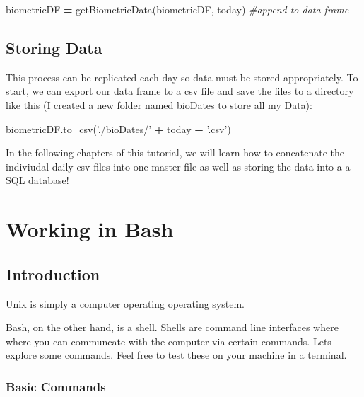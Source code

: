 \documentclass[]{book}
\newenvironment{Shaded}{\begin{snugshade}}{\end{snugshade}}
\newcommand{\StringTok}[1]{\textcolor[rgb]{0.31,0.60,0.02}{#1}}
\newcommand{\CommentTok}[1]{\textcolor[rgb]{0.56,0.35,0.01}{\textit{#1}}}
\newcommand{\OperatorTok}[1]{\textcolor[rgb]{0.81,0.36,0.00}{\textbf{#1}}}
\newcommand{\NormalTok}[1]{#1}
\begin{document}
\begin{Shaded}
\begin{Highlighting}[]
\NormalTok{biometricDF }\OperatorTok{=}\NormalTok{ getBiometricData(biometricDF, today) }\CommentTok{#append to data frame}
\end{Highlighting}
\end{Shaded}

\section{Storing Data}\label{storing-data}

This process can be replicated each day so data must be stored
appropriately. To start, we can export our data frame to a csv file and
save the files to a directory like this (I created a new folder named
bioDates to store all my Data):

\begin{Shaded}
\begin{Highlighting}[]
\NormalTok{biometricDF.to_csv(}\StringTok{'./bioDates/'} \OperatorTok{+}\NormalTok{ today }\OperatorTok{+} \StringTok{'.csv'}\NormalTok{)}
\end{Highlighting}
\end{Shaded}

In the following chapters of this tutorial, we will learn how to
concatenate the indiviudal daily csv files into one master file as well
as storing the data into a a SQL database!

\chapter{Working in Bash}\label{working-in-bash}

\section{Introduction}\label{introduction}

Unix is simply a computer operating operating system.

Bash, on the other hand, is a shell. Shells are command line interfaces
where where you can communcate with the computer via certain commands.
Lets explore some commands. Feel free to test these on your machine in a
terminal.

\subsection{Basic Commands}\label{basic-commands}
\end{document}
